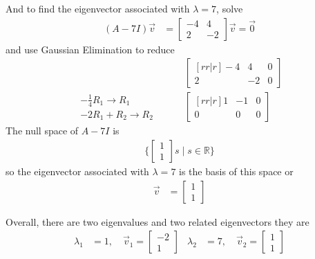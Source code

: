 \begin{example}
And to find the eigenvector associated with $\lambda = 7$, solve
% 
\begin{align*}
 (A - 7 I) \vec{v} & = 
\begin{bmatrix}
 -4 & 4 \\
 2 & -2 
\end{bmatrix} \vec{v} = \vec{0} 
\end{align*}
and use Gaussian Elimination to reduce
% 
\begin{align*}
 & \qquad \begin{bmatrix}[rr|r]
 -4 & 4 & 0 \\
 2 & -2 & 0 
\end{bmatrix} \\
\begin{array}{r}
-\frac{1}{4} R_1 \rightarrow R_1  \\
-2 R_1 + R_2 \rightarrow R_2  
\end{array} & \qquad
\begin{bmatrix}[rr|r]
1 & -1 & 0 \\
0 & 0 & 0  
\end{bmatrix}
\end{align*}
The null space of $A-7I$ is 
% 
\begin{align*}
\{
\begin{bmatrix}
 1 \\ 1 
\end{bmatrix} s \; | \; s \in \mathbb{R} \}
\end{align*}
so the eigenvector associated with $\lambda=7$ is the basis of this space or 
% 
\begin{align*}
 \vec{v} & = 
\begin{bmatrix}
 1 \\ 1 
\end{bmatrix}
\end{align*}

Overall, there are two eigenvalues and two related eigenvectors they are 
%
\begin{align*}
\lambda_1 & = 1, \quad \vec{v}_1 = \begin{bmatrix}
-2 \\1 
\end{bmatrix} & 
\lambda_2 & = 7, \quad \vec{v}_2 = \begin{bmatrix}
1 \\1 
\end{bmatrix} 
\end{align*}

\end{example}

